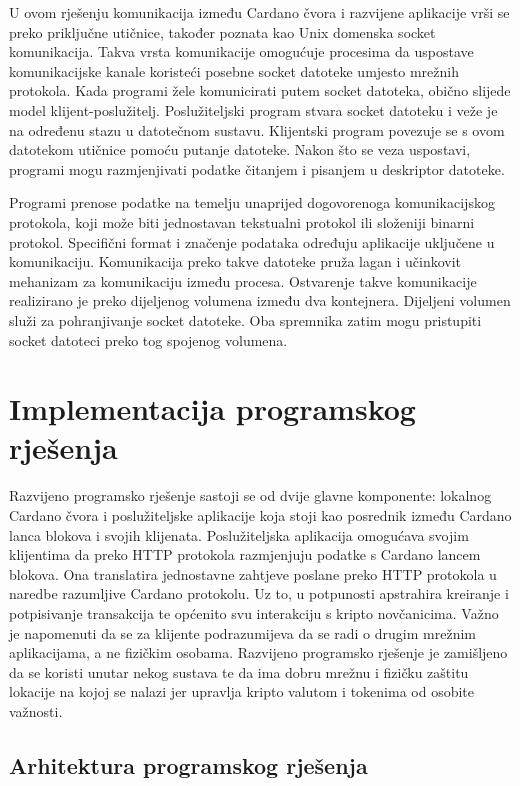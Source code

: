 \documentclass[times, utf8, diplomski]{fer}
\begin{document}
U ovom rješenju komunikacija između Cardano čvora i razvijene aplikacije vrši se preko priključne utičnice, također poznata kao Unix domenska socket komunikacija. Takva vrsta komunikacije omogućuje procesima da uspostave komunikacijske kanale koristeći posebne socket datoteke umjesto mrežnih protokola. Kada programi žele komunicirati putem socket datoteka, obično slijede model klijent-poslužitelj. Poslužiteljski program stvara socket datoteku i veže je na određenu stazu u datotečnom sustavu. Klijentski program povezuje se s ovom datotekom utičnice pomoću putanje datoteke. Nakon što se veza uspostavi, programi mogu razmjenjivati podatke čitanjem i pisanjem u deskriptor datoteke. 

Programi prenose podatke na temelju unaprijed dogovorenoga komunikacijskog protokola, koji može biti jednostavan tekstualni protokol ili složeniji binarni protokol. Specifični format i značenje podataka određuju aplikacije uključene u komunikaciju. Komunikacija preko takve datoteke pruža lagan i učinkovit mehanizam za komunikaciju između procesa. Ostvarenje takve komunikacije realizirano je preko dijeljenog volumena između dva kontejnera. Dijeljeni volumen služi za pohranjivanje socket datoteke. Oba spremnika zatim mogu pristupiti socket datoteci preko tog spojenog volumena.

\chapter{Implementacija programskog rješenja}

Razvijeno programsko rješenje sastoji se od dvije glavne komponente: lokalnog Cardano čvora i poslužiteljske aplikacije koja stoji kao posrednik između Cardano lanca blokova i svojih klijenata. Poslužiteljska aplikacija omogućava svojim klijentima da preko HTTP protokola razmjenjuju podatke s Cardano lancem blokova. Ona translatira jednostavne zahtjeve poslane preko HTTP protokola u naredbe razumljive Cardano protokolu. Uz to, u potpunosti apstrahira kreiranje i potpisivanje transakcija te općenito svu interakciju s kripto novčanicima. Važno je napomenuti da se za klijente podrazumijeva da se radi o drugim mrežnim aplikacijama, a ne fizičkim osobama. Razvijeno programsko rješenje je zamišljeno da se koristi unutar nekog sustava te da ima dobru mrežnu i fizičku zaštitu lokacije na kojoj se nalazi jer upravlja kripto valutom i tokenima od osobite važnosti.

\section{Arhitektura programskog rješenja}
\end{document}
